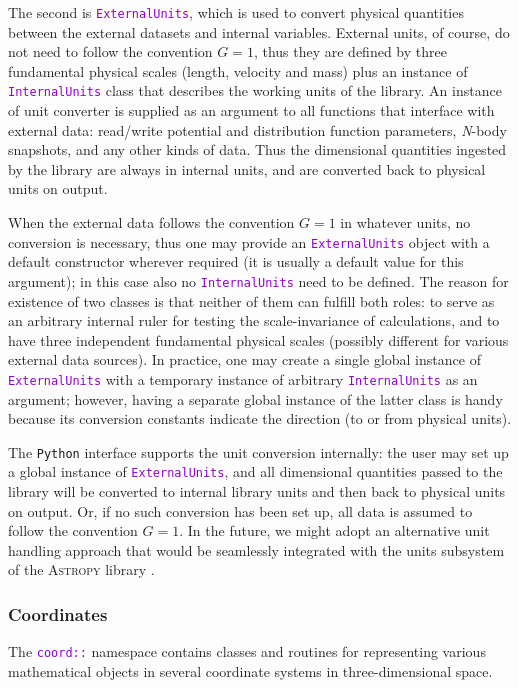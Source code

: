 \documentclass[12pt]{article}
\newcommand{\Nbody}{\textsl{N}-body\xspace}
\newcommand{\Python}{\texttt{Python}\xspace}
\newcommand{\ttt}[1]{\textcolor{darkviolet}{\texttt{#1}}}
\begin{document}
The second is \ttt{ExternalUnits}, which is used to convert physical quantities between the external datasets and internal variables. External units, of course, do not need to follow the convention $G=1$, thus they are defined by three fundamental physical scales (length, velocity and mass) plus an instance of \ttt{InternalUnits} class that describes the working units of the library. An instance of unit converter is supplied as an argument to all functions that interface with external data: read/write potential and distribution function parameters, \Nbody snapshots, and any other kinds of data. Thus the dimensional quantities ingested by the library are always in internal units, and are converted back to physical units on output.

When the external data follows the convention $G=1$ in whatever units, no conversion is necessary, thus one may provide an \ttt{ExternalUnits} object with a default constructor wherever required (it is usually a default value for this argument); in this case also no \ttt{InternalUnits} need to be defined. The reason for existence of two classes is that neither of them can fulfill both roles: to serve as an arbitrary internal ruler for testing the scale-invariance of calculations, and to have three independent fundamental physical scales (possibly different for various external data sources). In practice, one may create a single global instance of \ttt{ExternalUnits} with a temporary instance of arbitrary \ttt{InternalUnits} as an argument; however, having a separate global instance of the latter class is handy because its conversion constants indicate the direction (to or from physical units).

The \Python interface supports the unit conversion internally: the user may set up a global instance of \ttt{ExternalUnits}, and all dimensional quantities passed to the library will be converted to internal library units and then back to physical units on output. Or, if no such conversion has been set up, all data is assumed to follow the convention $G=1$. In the future, we might adopt an alternative unit handling approach that would be seamlessly integrated with the units subsystem of the \textsc{Astropy} library \cite{Astropy}.


\subsubsection{Coordinates}  \label{sec:Coords}
The \ttt{coord::} namespace contains classes and routines for representing various mathematical objects in several coordinate systems in three-dimensional space.
\end{document}
